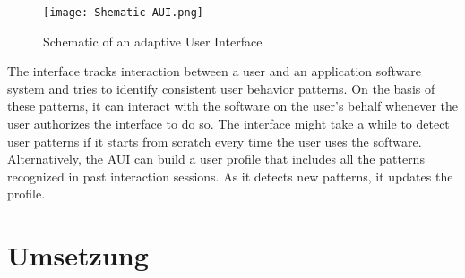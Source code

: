 \begin{figure}[h]
    \centering
    \texttt{[image: Shematic-AUI.png]}
    \caption{Schematic of an adaptive User Interface}
\end{figure}
\newpage
The interface tracks interaction between a user and an application software system and tries to identify consistent user behavior patterns.
On the basis of these patterns, it can interact with the software on the user’s behalf whenever the user authorizes the interface to do
so. The interface might take a while to detect user patterns if it starts from scratch every time the user uses the software. Alternatively,
the AUI can build a user profile that includes all the patterns recognized in past interaction sessions. As it detects new patterns, it updates
the profile.

\chapter{Umsetzung}

